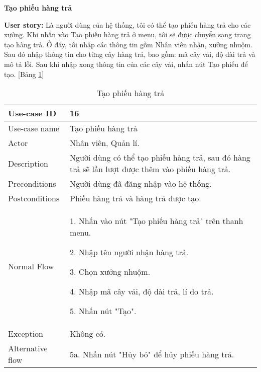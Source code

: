 \textbf{Tạo phiếu hàng trả}\par
\textbf{User story:} Là người dùng của hệ thống, tôi có thể tạo phiếu hàng trả cho các xưởng. Khi nhấn vào Tạo phiếu hàng trả ở menu, tôi sẽ được chuyển sang trang tạo hàng trả. Ở đây, tôi nhập các thông tin gồm Nhân viên nhận, xưởng nhuộm. Sau đó nhập thông tin cho từng cây hàng trả, bao gồm: mã cây vải, độ dài trả và mô tả lỗi. Sau khi nhập xong thông tin của các cây vải, nhấn nút Tạo phiếu để tạo. [Bảng \ref{bang13}]
\begin{table}[H]
    \centering
    \begin{tabular}{|m{3cm}|m{10cm}|}
    \hline 
        Use-case ID & 16\\ \hline
        Use-case name & Tạo phiếu hàng trả\\ \hline
        Actor & Nhân viên, Quản lí.\\ \hline
        Description & Người dùng có thể tạo phiếu hàng trả, sau đó hàng trả sẽ lần lượt được thêm vào phiếu hàng trả.\\ \hline
        Preconditions & Người dùng đã đăng nhập vào hệ thống.\\ \hline
        Postconditions & Phiếu hàng trả và hàng trả được tạo.\\ \hline
        Normal Flow & 
        1. Nhấn vào nút "Tạo phiếu hàng trả" trên thanh menu.\par 
        2. Nhập tên người nhận hàng trả.\par
        3. Chọn xưởng nhuộm.\par 
        4. Nhập mã cây vải, độ dài trả, lí do trả.\par
        5. Nhấn nút "Tạo".
        \\ \hline
        Exception & Không có.
        \\ \hline
        Alternative flow & 
        5a. Nhấn nút "Hủy bỏ" để hủy phiếu hàng trả.
        \\ 
    \hline 
    \end{tabular}
    \caption{Tạo phiếu hàng trả}
    \label{bang13}
\end{table}


